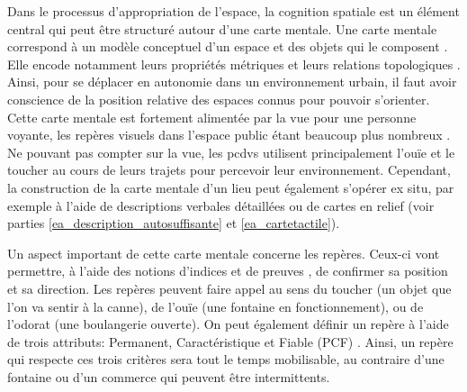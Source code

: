 

\newpar{}

Dans le processus d'appropriation de l'espace, la cognition spatiale est un élément central qui peut être structuré autour d'une carte mentale. Une carte mentale correspond à un modèle conceptuel d'un espace et des objets qui le composent \citep{Jacobson1998}. Elle encode notamment leurs propriétés métriques et leurs relations topologiques \citep{Denis1992}. Ainsi, pour se déplacer en autonomie dans un environnement urbain, il faut avoir conscience de la position relative des espaces connus pour pouvoir s'orienter. Cette carte mentale est fortement alimentée par la vue pour une personne voyante, les repères visuels dans l'espace public étant beaucoup plus nombreux \citep{thinus1997}. Ne pouvant pas compter sur la vue, les \glspl{pcdv} utilisent principalement l'ouïe et le toucher au cours de leurs trajets pour percevoir leur environnement. Cependant, la construction de la carte mentale d'un lieu peut également s'opérer ex situ, par exemple à l'aide de descriptions verbales détaillées ou de cartes en relief (voir parties \ref{ea_description_autosuffisante} et \ref{ea_cartetactile}).

\newpar{}

Un aspect important de cette carte mentale concerne les repères. Ceux-ci vont permettre, à l'aide des notions d'indices et de preuves \citep{Giudice2010}, de confirmer sa position et sa direction. Les repères peuvent faire appel au sens du toucher (un objet que l'on va sentir à la canne), de l'ouïe (une fontaine en fonctionnement), ou de l'odorat (une boulangerie ouverte). On peut également définir un repère à l'aide de trois attributs: Permanent, Caractéristique et Fiable (PCF) \citep{Denis2023}. Ainsi, un repère qui respecte ces trois critères sera tout le temps mobilisable, au contraire d'une fontaine ou d'un commerce qui peuvent être intermittents. 


